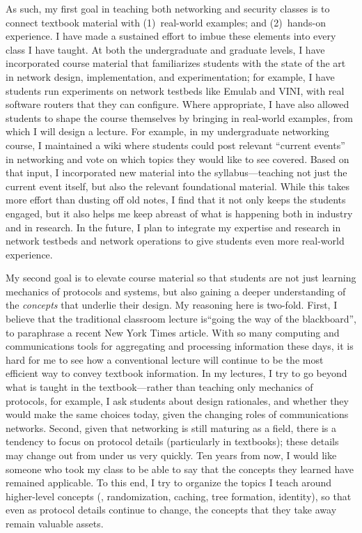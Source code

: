 As such, my first goal in teaching both networking and security classes
is to connect textbook material with (1)~real-world examples; and
(2)~hands-on experience.  I have made a sustained effort to imbue these
elements into every class I have taught.  At both the undergraduate and
graduate levels, I have incorporated course material that familiarizes
students with the state of the art in network design, implementation, and
experimentation; for example, I have students run experiments on network
testbeds like Emulab and VINI, with real software routers that they can
configure.  Where appropriate, I have also allowed students to shape the
course themselves by bringing in real-world examples, from which I will
design a lecture.  For example, in my undergraduate networking course, I
maintained a wiki where students could post relevant ``current events''
in networking and vote on which topics they would like to see covered.
Based on that input, I incorporated new material into the
syllabus---teaching not just the current event itself, but also the
relevant foundational material.  While this takes more effort than
dusting off old notes, I find that it not only keeps the students
engaged, but it also helps me keep abreast of what is happening both in
industry and in research.  In the future, I plan to integrate my
expertise and research in network testbeds and network operations to
give students even more real-world experience.

My second goal is to elevate course material so that students are not
just learning mechanics of protocols and systems, but also gaining a
deeper understanding of the {\em concepts} that underlie their design.
My reasoning here is two-fold.  First, I believe that the traditional
classroom lecture is``going the way of the blackboard'', to paraphrase a
recent New York Times article.  With so many computing and
communications tools for aggregating and processing information these
days, it is hard for me to see how a conventional lecture will continue
to be the most efficient way to convey textbook information.  In my
lectures, I try to go beyond what is taught in the textbook---rather
than teaching only mechanics of protocols, for example, I ask students
about design rationales, and whether they would make the same choices
today, given the changing roles of communications networks.  Second,
given that networking is still maturing as a field, there is a tendency
to focus on protocol details (particularly in textbooks); these details
may change out from under us very quickly.  Ten years from now, I would
like someone who took my class to be able to say that the concepts they
learned have remained applicable.  To this end, I try to organize the
topics I teach around higher-level concepts (\eg, randomization,
caching, tree formation, identity), so that even as protocol details
continue to change, the concepts that they take away remain valuable
assets.

